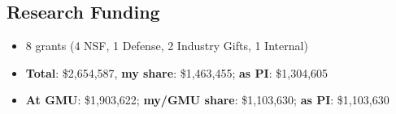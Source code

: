 \documentclass[11pt]{article}
\begin{document}
\subsection{Research Funding}
\begin{itemize}[label={},before=\small]
\item 8 grants (4 NSF, 1 Defense, 2 Industry Gifts, 1 Internal)

\item \textbf{Total}: \$2,654,587, \textbf{my share}: \$1,463,455;  \textbf{as PI}: \$1,304,605
\item \textbf{At GMU}: \$1,903,622; \textbf{my/GMU share}: \$1,103,630; \textbf{as PI}: \$1,103,630
\end{itemize}


\end{document}
